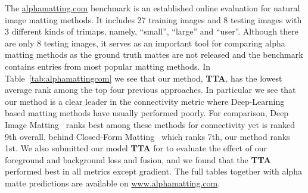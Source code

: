 \documentclass[runningheads]{llncs}
\begin{document}
The \url{alphamatting.com} benchmark is an established online evaluation for natural image matting methods. It includes 27 training images and 8 testing images with 3 different kinds of trimaps, namely, “small”, “large” and “user”. Although there are only 8 testing images, it serves as an important tool for comparing alpha matting methods as the ground truth mattes are not released and the benchmark contains entries from most popular matting methods. In Table~\ref{tab:alphamattingcom} we see that our method, \textbf{ TTA}, has the lowest average rank among the top four previous approaches. In particular we see that our method is a clear leader in the connectivity metric where Deep-Learning based matting methods have usually performed poorly. For comparison, Deep Image Matting~\cite{DeepImageMatting} ranks best among these methods for connectivity yet is ranked 9th overall, behind Closed-Form Matting~\cite{ClosedFormMattingPAMI} which ranks 7th, our method ranks 1st. We also submitted our model \textbf{ TTA} for to evaluate the effect of our foreground and background loss and fusion, and we found that the \textbf{ TTA} performed best in all metrics except gradient. The full tables together with alpha matte predictions are available on \url{www.alphamatting.com}. 
\end{document}

